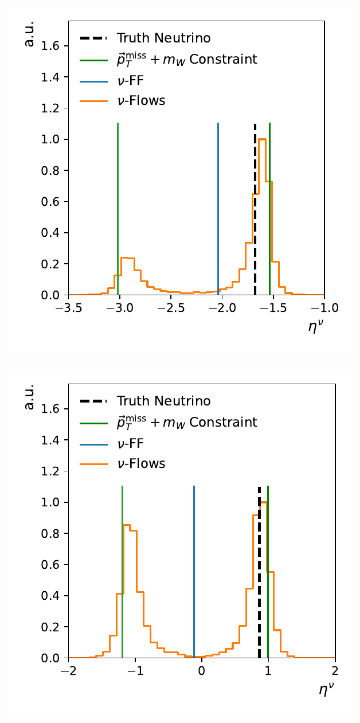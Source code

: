 \begin{figure}[ht]
    \centering
    \begin{subfigure}{0.32\textwidth}
        \includegraphics[width=\textwidth]{Figures/neutrino_unfolding/eta_5.pdf}
        \caption{} \label{fig:inf_good}
    \end{subfigure}
    \begin{subfigure}{0.32\textwidth}
        \includegraphics[width=\textwidth]{Figures/neutrino_unfolding/eta_9.pdf}

\end{subfigure}
\end{figure}
